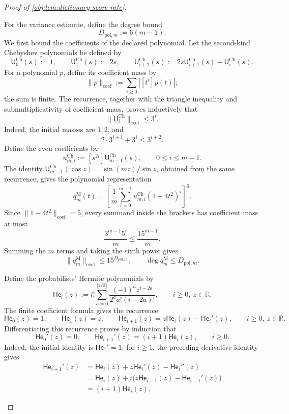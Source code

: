 \documentclass[11pt]{article}
\begin{document}
\begin{proof}[Proof of \cref{obj:lem:dictionary-score-rate}]
\begin{enumerate}
For the variance estimate, define the degree bound
\[
D_{\mathrm{pol},m}:=6(m-1).
\]
We first bound the coefficients of the declared polynomial. Let the second-kind Chebyshev polynomials be defined by
\[
\mathsf U^{\mathrm{Ch}}_0(s):=1,\qquad
\mathsf U^{\mathrm{Ch}}_1(s):=2s,\qquad
\mathsf U^{\mathrm{Ch}}_{i+2}(s)
:=2s\mathsf U^{\mathrm{Ch}}_{i+1}(s)-\mathsf U^{\mathrm{Ch}}_i(s).
\]
For a polynomial \(p\), define its coefficient mass by
\[
\|p\|_{\mathrm{coef}}
:=\sum_{i\ge0}|[t^i]p(t)|;
\]
the sum is finite. The recurrence, together with the triangle inequality and submultiplicativity of coefficient mass, proves inductively that
\[
\|\mathsf U^{\mathrm{Ch}}_i\|_{\mathrm{coef}}\le3^i.
\]
Indeed, the initial masses are \(1,2\), and
\[
2\cdot3^{i+1}+3^i\le3^{i+2}.
\]
Define the even coefficients by
\[
u^{\mathrm{Ch}}_{m,i}:=[s^{2i}]\mathsf U^{\mathrm{Ch}}_{m-1}(s),
\qquad 0\le i\le m-1.
\]
The identity
\(\mathsf U^{\mathrm{Ch}}_{m-1}(\cos z)=\sin(mz)/\sin z\),
obtained from the same recurrence, gives the polynomial representation
\[
q_m^{\mathrm M}(t)
=\left[
\frac1m\sum_{i=0}^{m-1}
u^{\mathrm{Ch}}_{m,i}(1-4t^2)^i
\right]^6.
\]
Since \(\|1-4t^2\|_{\mathrm{coef}}=5\), every summand inside the brackets has coefficient mass at most
\[
\frac{3^{m-1}5^i}{m}\le\frac{15^{m-1}}m.
\]
Summing the \(m\) terms and taking the sixth power gives
\[
\|q_m^{\mathrm M}\|_{\mathrm{coef}}
\le15^{D_{\mathrm{pol},m}},
\qquad
\deg q_m^{\mathrm M}\le D_{\mathrm{pol},m}.
\]

Define the probabilists' Hermite polynomials by
\[
\mathsf{He}_i(z)
:=i!\sum_{a=0}^{\lfloor i/2\rfloor}
\frac{(-1)^a z^{i-2a}}{2^a a!(i-2a)!},
\qquad i\ge0,\ z\in\mathbb R.
\]
The finite coefficient formula gives the recurrence
\[
\mathsf{He}_0(z)=1,\qquad
\mathsf{He}_1(z)=z,\qquad
\mathsf{He}_{i+1}(z)=z\mathsf{He}_i(z)-\mathsf{He}_i'(z),
\qquad i\ge0,\ z\in\mathbb R.
\]
Differentiating this recurrence proves by induction that
\[
\mathsf{He}_0'(z)=0,\qquad
\mathsf{He}_{i+1}'(z)=(i+1)\mathsf{He}_i(z),
\qquad i\ge0.
\]
Indeed, the initial identity is \(\mathsf{He}_1'=1\); for \(i\ge1\), the preceding derivative identity gives
\[
\begin{aligned}
\mathsf{He}_{i+1}'(z)
&=\mathsf{He}_i(z)+z\mathsf{He}_i'(z)-\mathsf{He}_i''(z)\\
&=\mathsf{He}_i(z)
+i\bigl(z\mathsf{He}_{i-1}(z)-\mathsf{He}_{i-1}'(z)\bigr)\\
&=(i+1)\mathsf{He}_i(z).
\end{aligned}
\]


\end{enumerate}
\end{proof}
\end{document}
